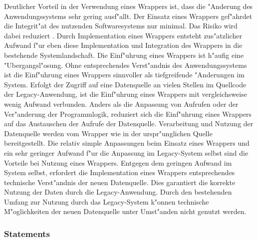



Deutlicher Vorteil in der Verwendung eines Wrappers ist, dass die "Anderung des Anwendungssystems sehr gering ausf"allt. Der Einsatz eines Wrappers gef"ahrdet die Integrit"at des nutzenden Softwaresystems nur minimal. Das Risiko wird dabei reduziert \citep{henrard-2002}. 
\lb
Durch Implementation eines Wrappers entsteht zus"atzlicher Aufwand f"ur eben diese Implementation und Integration des Wrappers in die bestehende Systemlandschaft. Die Einf"uhrung eines Wrappers ist h"aufig eine "Ubergangsl"osung. Ohne entsprechendes Verst"andnis des Anwendungssystems ist die Einf"uhrung eines Wrappers sinnvoller als tiefgreifende "Anderungen im System. 
\lb
Erfolgt der Zugriff auf eine Datenquelle an vielen Stellen im Quellcode der Legacy-Anwendung, ist die Einf"uhrung eines Wrappers mit vergleichsweise wenig Aufwand verbunden. Anders als die Anpassung von Aufrufen oder der Ver"anderung der Programmlogik, reduziert sich die Einf"uhrung eines Wrappers auf das Austauschen der Aufrufe der Datenquelle. Verarbeitung und Nutzung der Datenquelle werden vom Wrapper wie in der urspr"unglichen Quelle bereitgestellt. Die relativ simple Anpassungen beim Einsatz eines Wrappers und ein sehr geringer Aufwand f"ur die Anpassung im Legacy-System selbst sind die Vorteile bei Nutzung eines Wrappers. Entgegen dem geringen Aufwand im System selbst, erfordert die Implementation eines Wrappers entsprechendes technische Verst"andnis der neuen Datenquelle. Dies garantiert die korrekte Nutzung der Daten durch die Legacy-Anwendung. Durch den bestehenden Umfang zur Nutzung durch das Legacy-System k"onnen technische M"oglichkeiten der neuen Datenquelle unter Umst"anden nicht genutzt werden.

\subsubsection{Statements}

